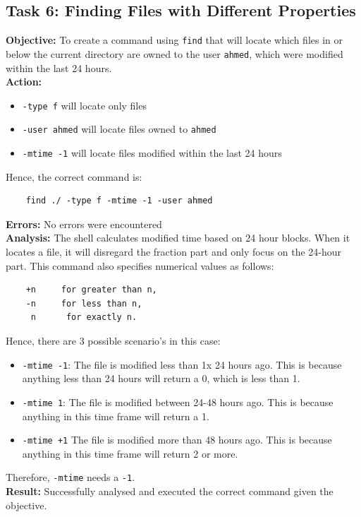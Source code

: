 \documentclass{article}
\begin{document}
\subsection{Task 6: Finding Files with Different Properties}
%
\textbf{Objective:} To create a command using \texttt{find} that will locate which files in or below the current directory are owned to the user \texttt{ahmed}, which were modified within the last 24 hours.\\
\textbf{Action:}
\begin{itemize}
    \item \texttt{-type f} will locate only files
    \item \texttt{-user ahmed} will locate files owned to \texttt{ahmed}
    \item \texttt{-mtime -1} will locate files modified within the last 24 hours
\end{itemize}
Hence, the correct command is:
\begin{verbatim}
    find ./ -type f -mtime -1 -user ahmed
\end{verbatim}
\textbf{Errors:} No errors were encountered\\
\textbf{Analysis:} The shell calculates modified time based on 24 hour blocks. When it locates a file, it will disregard the fraction part and only focus on the 24-hour part. This command also specifies numerical values as follows:
\begin{verbatim}
    +n     for greater than n,
    -n     for less than n,
     n      for exactly n.
\end{verbatim}
Hence, there are 3 possible scenario's in this case:
\begin{itemize}
    \item \texttt{-mtime -1}: The file is modified less than 1x 24 hours ago. This is because anything less than 24 hours will return a 0, which is less than 1.
    \item \texttt{-mtime 1}: The file is modified between 24-48 hours ago. This is because anything in this time frame will return a 1.
    \item \texttt{-mtime +1} The file is modified more than 48 hours ago. This is because anything in this time frame will return 2 or more.
\end{itemize}
Therefore, \texttt{-mtime} needs a \texttt{-1}.\\
\textbf{Result:} Successfully analysed and executed the correct command given the objective.


\newpage
\end{document}
